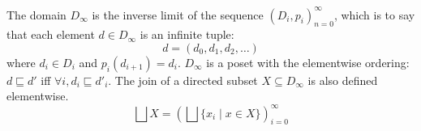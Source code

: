 \documentclass{tufte-handout}
\begin{document}












The domain $D_{\infty}$ is the inverse limit of the sequence
$(D_i,p_i)_{n=0}^\infty$, which is to say that each element 
$d \in D_{\infty}$ is an infinite tuple:
\[
   d=(d_0,d_1, d_2, \ldots )
\]
where $d_i \in D_i$ and $p_i(d_{i+1}) = d_i$.  $D_\infty$ is a poset
with the elementwise ordering: $d \sqsubseteq d'$ iff $\forall i, d_i
\sqsubseteq d'_i$.  The join of a directed subset $X \subseteq
D_\infty$ is also defined elementwise.
\[
   \bigsqcup X = \left( \bigsqcup \{ x_i \mid x \in X \} \right)^\infty_{i=0}
\]
\end{document}
